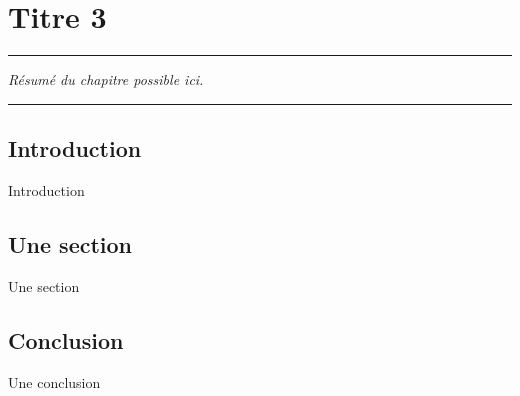 
\lhead[\fancyplain{}{\leftmark}]%
{\fancyplain{}{}} %
\chead[\fancyplain{}{}]%
{\fancyplain{}{}}
\rhead[\fancyplain{}{}]%
{\fancyplain{}{\rightmark}}%
\lfoot[\fancyplain{}{}]%
{\fancyplain{}{}}
\cfoot[\fancyplain{}{\thepage}]%
{\fancyplain{}{\thepage}} %
\rfoot[\fancyplain{}{}]%
{\fancyplain{}{\scriptsize}}



\chapter{Titre 3}
\label{ch:3}


\begin{center}
	\rule{0.7\linewidth}{.5pt}
	\begin{minipage}{0.7\linewidth}
		\smallskip
		
		\textit{Résumé du chapitre possible ici.
		}
		
	\end{minipage}
	\smallskip
	\rule{0.7\linewidth}{.5pt}
\end{center}

\minitoc[mtc3]
\newpage


\section{Introduction}

Introduction

\section{Une section}

Une section

\section{Conclusion}

Une conclusion